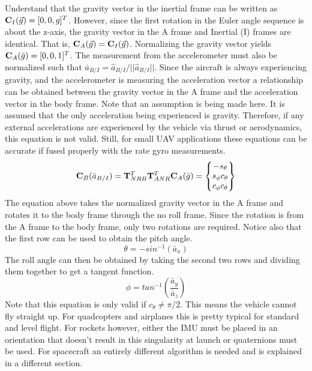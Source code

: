 \documentclass{article}
\begin{document}
Understand that the gravity vector in the inertial frame can be written as ${\bf C}_I(\vec{g}) = [0,0,g]^T$. However, since the first rotation in the Euler angle sequence is about the z-axis, the gravity vector in the A frame and Inertial (I) frames are identical. That is, ${\bf C}_A(\vec{g}) = {\bf C}_I(\vec{g})$. Normalizing the gravity vector yields ${\bf C}_A(\bar{g})=[0,0,1]^T$. The measurement from the accelerometer must also be normalized such that $\bar{a}_{B/I}=\hat{a}_{B/I}/||\hat{a}_{B/I}||$. Since the aircraft is always experiencing gravity, and the accelerometer is measuring the acceleration vector a relationship can be obtained between the gravity vector in the A frame and the acceleration vector in the body frame. Note that an assumption is being made here. It is assumed that the only acceleration being experienced is gravity. Therefore, if any external accelerations are experienced by the vehicle via thrust or aerodynamics, this equation is not valid. Still, for small UAV applications these equations can be accurate if fused properly with the rate gyro measurements. 
\begin{equation}
{\bf C}_B(\bar{a}_{B/I}) = {\bf T}_{NRB}^T{\bf T}_{ANR}^T{\bf C}_A(\bar{g}) = \begin{Bmatrix} -s_{\theta} \\ s_{\phi}c_{\theta} \\ c_{\phi}c_{\theta}\end{Bmatrix}
\end{equation}
The equation above takes the normalized gravity vector in the A frame and rotates it to the body frame through the no roll frame. Since the rotation is from the A frame to the body frame, only two rotations are required. Notice also that the first row can be used to obtain the pitch angle. 
\begin{equation}
\theta = -sin^{-1}(\bar{a}_x)
\end{equation}
The roll angle can then be obtained by taking the second two rows and dividing them together to get a tangent function. 
\begin{equation}
\phi = tan^{-1}\left(\frac{\bar{a}_y}{\bar{a}_z}\right)
\end{equation}
Note that this equation is only valid if $c_{\theta} \neq \pi/2$. This means the vehicle cannot fly straight up. For quadcopters and airplanes this is pretty typical for standard and level flight. For rockets however, either the IMU must be placed in an orientation that doesn't result in this singularity at launch or quaternions must be used. For spacecraft an entirely different algorithm is needed and is explained in a different section. 
\end{document}
